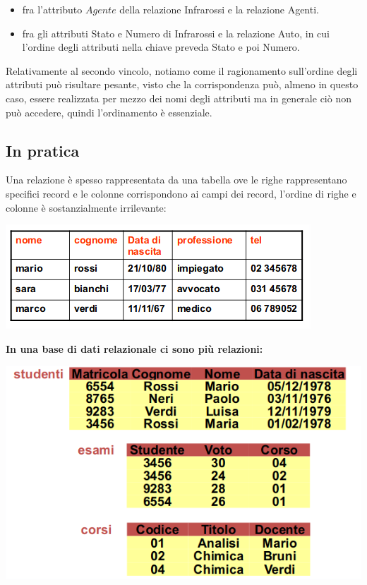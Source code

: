 \documentclass[a4paper,12pt, oneside]{book}
\begin{document}
\begin{itemize}
\begin{itemize}
            \item fra l'attributo $Agente$ della relazione Infrarossi e la relazione Agenti.
            \item fra gli attributi Stato e Numero di Infrarossi e la relazione Auto, in cui l'ordine degli
                attributi nella chiave preveda Stato e poi Numero.
        \end{itemize}
        Relativamente al secondo vincolo, notiamo come il ragionamento sull'ordine degli attributi può
        risultare pesante, visto che la corrispondenza può, almeno in questo caso, essere realizzata per mezzo
        dei nomi degli attributi ma in generale ciò non può accedere, quindi l'ordinamento è essenziale.

\end{itemize}

\subsection{In pratica}
Una relazione è spesso rappresentata da una tabella ove le righe rappresentano specifici record e le colonne corrispondono ai campi dei record, l'ordine di righe e colonne è sostanzialmente irrilevante:
\begin{center}
	\includegraphics[scale=0.7]{img/rel.png}
\end{center}
\textbf{In una base di dati relazionale ci sono più relazioni:}
\begin{center}
	\includegraphics[scale=0.7]{img/rel2.png}
\end{center}
\end{document}
